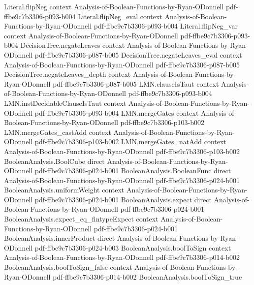 \begin{theorem}
\proofstep
  {Literal.flipNeg}
  {context}
  {Analysis-of-Boolean-Functions-by-Ryan-ODonnell}
  {pdf-ffbe9c7b3306-p093-b004}
\proofstep
  {Literal.flipNeg_eval}
  {context}
  {Analysis-of-Boolean-Functions-by-Ryan-ODonnell}
  {pdf-ffbe9c7b3306-p093-b004}
\proofstep
  {Literal.flipNeg_var}
  {context}
  {Analysis-of-Boolean-Functions-by-Ryan-ODonnell}
  {pdf-ffbe9c7b3306-p093-b004}
\proofstep
  {DecisionTree.negateLeaves}
  {context}
  {Analysis-of-Boolean-Functions-by-Ryan-ODonnell}
  {pdf-ffbe9c7b3306-p087-b005}
\proofstep
  {DecisionTree.negateLeaves_eval}
  {context}
  {Analysis-of-Boolean-Functions-by-Ryan-ODonnell}
  {pdf-ffbe9c7b3306-p087-b005}
\proofstep
  {DecisionTree.negateLeaves_depth}
  {context}
  {Analysis-of-Boolean-Functions-by-Ryan-ODonnell}
  {pdf-ffbe9c7b3306-p087-b005}
\proofstep
  {LMN.clauseIsTaut}
  {context}
  {Analysis-of-Boolean-Functions-by-Ryan-ODonnell}
  {pdf-ffbe9c7b3306-p093-b004}
\proofstep
  {LMN.instDecidableClauseIsTaut}
  {context}
  {Analysis-of-Boolean-Functions-by-Ryan-ODonnell}
  {pdf-ffbe9c7b3306-p093-b004}
\proofstep
  {LMN.mergeGates}
  {context}
  {Analysis-of-Boolean-Functions-by-Ryan-ODonnell}
  {pdf-ffbe9c7b3306-p103-b002}
\proofstep
  {LMN.mergeGates_castAdd}
  {context}
  {Analysis-of-Boolean-Functions-by-Ryan-ODonnell}
  {pdf-ffbe9c7b3306-p103-b002}
\proofstep
  {LMN.mergeGates_natAdd}
  {context}
  {Analysis-of-Boolean-Functions-by-Ryan-ODonnell}
  {pdf-ffbe9c7b3306-p103-b002}
\proofstep
  {BooleanAnalysis.BoolCube}
  {direct}
  {Analysis-of-Boolean-Functions-by-Ryan-ODonnell}
  {pdf-ffbe9c7b3306-p024-b001}
\proofstep
  {BooleanAnalysis.BooleanFunc}
  {direct}
  {Analysis-of-Boolean-Functions-by-Ryan-ODonnell}
  {pdf-ffbe9c7b3306-p024-b001}
\proofstep
  {BooleanAnalysis.uniformWeight}
  {context}
  {Analysis-of-Boolean-Functions-by-Ryan-ODonnell}
  {pdf-ffbe9c7b3306-p024-b001}
\proofstep
  {BooleanAnalysis.expect}
  {direct}
  {Analysis-of-Boolean-Functions-by-Ryan-ODonnell}
  {pdf-ffbe9c7b3306-p024-b001}
\proofstep
  {BooleanAnalysis.expect_eq_fintypeExpect}
  {context}
  {Analysis-of-Boolean-Functions-by-Ryan-ODonnell}
  {pdf-ffbe9c7b3306-p024-b001}
\proofstep
  {BooleanAnalysis.innerProduct}
  {direct}
  {Analysis-of-Boolean-Functions-by-Ryan-ODonnell}
  {pdf-ffbe9c7b3306-p024-b003}
\proofstep
  {BooleanAnalysis.boolToSign}
  {context}
  {Analysis-of-Boolean-Functions-by-Ryan-ODonnell}
  {pdf-ffbe9c7b3306-p014-b002}
\proofstep
  {BooleanAnalysis.boolToSign_false}
  {context}
  {Analysis-of-Boolean-Functions-by-Ryan-ODonnell}
  {pdf-ffbe9c7b3306-p014-b002}
\proofstep
  {BooleanAnalysis.boolToSign_true}

\end{theorem}
